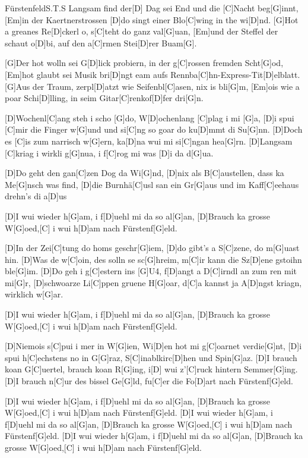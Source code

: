 \documentclass[../main.tex]{subfiles}
\begin{document}
\begin{song}{Fürstenfeld}{S.T.S}{}
Langsam find der[D] Dag sei End und die [C]Nacht beg[G]innt,
[Em]in der Kaertnerstrossen [D]do singt einer \glqq{}Blo[C]wing in the wi[D]nd\grqq{}.
[G]Hot a greanes Re[D]ckerl o, s[C]teht do ganz val[G]uan,
[Em]und der Steffel der schaut o[D]bi, auf den a[C]rmen Stei[D]rer Buam[G].

[G]Der hot wolln sei G[D]lick probiern, in der g[C]rossen fremden Scht[G]od,
[Em]hot glaubt sei Musik bri[D]ngt eam aufs Rennba[C]hn-Express-Tit[D]elblatt.
[G]Aus der Traum, zerpl[D]atzt wie Seifenbl[C]asen, nix is bli[G]m,
[Em]ois wie a poar Schi[D]lling, in seim Gitar[C]renkof[D]fer dri[G]n.

[D]Wochenl[C]ang steh i scho [G]do, W[D]ochenlang [C]plag i mi [G]a,
[D]i spui [C]mir die Finger w[G]und und si[C]ng so goar do ku[D]mmt di Su[G]nn.
[D]Doch es [C]is zum narrisch w[G]ern, ka[D]na wui mi si[C]ngan hea[G]rn.
[D]Langsam [C]kriag i wirkli g[G]nua, i f[C]rog mi was [D]i da d[G]ua.

[D]Do geht den gan[C]zen Dog da Wi[G]nd, [D]nix als B[C]austellen, dass ka Me[G]nsch was find,
[D]die Burnhä[C]usl san ein Gr[G]aus und im Kaff[C]eehaus drehn’s di a[D]us

[D]I wui wieder h[G]am, i f[D]uehl mi da so al[G]an,
[D]Brauch ka grosse W[G]oed,[C] i wui h[D]am nach Fürstenf[G]eld.

[D]In der Zei[C]tung do homs geschr[G]iem, [D]do gibt's a S[C]zene, do m[G]uast hin.
[D]Was de w[C]oin, des  solln se sc[G]hreim, m[C]ir kann die Sz[D]ene gstoihn ble[G]im.
[D]Do geh i g[C]estern ins [G]U4, f[D]angt a D[C]irndl an zum ren mit mi[G]r,
[D]schwoarze Li[C]ppen gruene H[G]oar, d[C]a kannst ja A[D]ngst kriagn, wirklich w[G]ar.

[D]I wui wieder h[G]am, i f[D]uehl mi da so al[G]an,
[D]Brauch ka grosse W[G]oed,[C] i wui h[D]am nach Fürstenf[G]eld.

[D]Niemois s[C]pui i mer in W[G]ien, Wi[D]en hot mi g[C]oarnet verdie[G]nt,
[D]i spui h[C]echstens no in G[G]raz, S[C]inablkirc[D]hen und Spin[G]az.
[D]I brauch koan G[C]uertel, brauch koan R[G]ing, i[D] wui z'[C]ruck hintern Semmer[G]ing.
[D]I brauch n[C]ur des bissel Ge[G]ld, fu[C]er die Fo[D]art nach Fürstenf[G]eld.

[D]I wui wieder h[G]am, i f[D]uehl mi da so al[G]an,
[D]Brauch ka grosse W[G]oed,[C] i wui h[D]am nach Fürstenf[G]eld.
[D]I wui wieder h[G]am, i f[D]uehl mi da so al[G]an,
[D]Brauch ka grosse W[G]oed,[C] i wui h[D]am nach Fürstenf[G]eld.
[D]I wui wieder h[G]am, i f[D]uehl mi da so al[G]an,
[D]Brauch ka grosse W[G]oed,[C] i wui h[D]am nach Fürstenf[G]eld.

\end{song}
\end{document}
